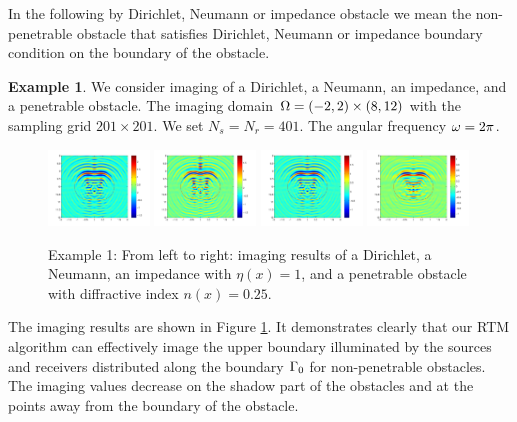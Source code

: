 \documentclass[12pt]{iopart}
\begin{document}
{In the following by Dirichlet, Neumann or impedance obstacle we mean the non-penetrable obstacle that
satisfies Dirichlet, Neumann or impedance boundary condition on the boundary of the obstacle.

\bigskip
\textbf{Example 1}.
We consider imaging of a Dirichlet, a Neumann, an impedance, and a penetrable obstacle. The imaging domain $\Omega=(-2,2) \times (8, 12)$ with the sampling grid $201 \times 201$. We set $N_s = N_r = 401$. The angular frequency $\omega=2\pi$.
 \begin{figure}
 	\centering
 	\includegraphics[width=0.24\textwidth]{./graphic/peanut_3pi-eps-converted-to.pdf}
 	\includegraphics[width=0.24\textwidth]{./graphic/peanut_3pi_neumann-eps-converted-to.pdf}
 	\includegraphics[width=0.24\textwidth]{./graphic/peanut_3pi_impedance_1-eps-converted-to.pdf}
 	\includegraphics[width=0.24\textwidth]{./graphic/peanut_3pi_transmission-eps-converted-to.pdf}
 	\caption{Example 1: From left to right: imaging results of a Dirichlet, a Neumann, an impedance with $\eta(x)=1$, and a penetrable obstacle with diffractive index $n(x)=0.25$.} \label{figure_1}
 \end{figure}
 
 The imaging results are shown in Figure \ref{figure_1}. It demonstrates clearly that our RTM
 algorithm can effectively image the upper boundary illuminated by the sources and
 receivers distributed along the boundary $\Gamma_0$ for non-penetrable obstacles. The imaging
 values decrease on the shadow part of the obstacles and at the points away from the
 boundary of the obstacle.

}
\end{document}
